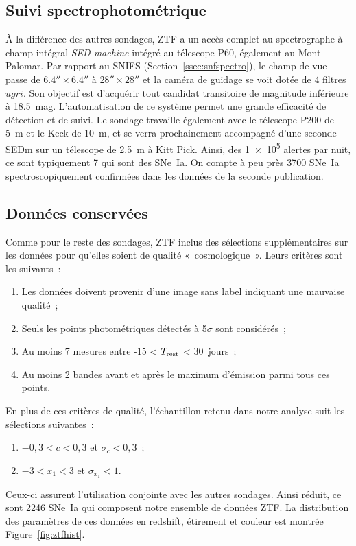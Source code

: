 \documentclass[../main/main.tex]{subfiles}
\begin{document}
\subsection{Suivi spectrophotométrique}\label{ssec:ztfspectro}

À la différence des autres sondages, ZTF a un accès complet au spectrographe à
champ intégral \textit{SED machine} \citep[SEDm, voir][]{blagorodnova2018,
rigault2019} intégré au télescope P60, également au Mont Palomar. Par rapport au
SNIFS (Section~\ref{ssec:snfspectro}), le champ de vue passe de
$\ang{;;6.4}\times\ang{;;6.4}$ à $\ang{;;28}\times\ang{;;28}$ et la caméra de
guidage se voit dotée de 4 filtres $ugri$. Son objectif est d'acquérir tout
candidat transitoire de magnitude inférieure à \SI{18.5}{mag}. L'automatisation
de ce système permet une grande efficacité de détection et de suivi. Le sondage
travaille également avec le télescope P200 de \SI{5}{m} et le Keck de
\SI{10}{m}, et se verra prochainement accompagné d'une seconde SEDm sur un
télescope de \SI{2.5}{m} à Kitt Pick. Ainsi, des \num{1e5} alertes par nuit, ce
sont typiquement 7 qui sont des SNe~Ia. On compte à peu près 3700 SNe~Ia
spectroscopiquement confirmées dans les données de la seconde publication.

\subsection{Données conservées}\label{ssec:ztfdata}

Comme pour le reste des sondages, ZTF inclus des sélections supplémentaires sur
les données pour qu'elles soient de qualité «~cosmologique~». Leurs critères
sont les suivants~:
\begin{enumerate}
    \item Les données doivent provenir d'une image sans label indiquant une
        mauvaise qualité~;
    \item Seuls les points photométriques détectés à 5$\sigma$ sont considérés~;
    \item Au moins 7 mesures entre -15 < $T_{\rm rest}$ < \SI{30}{jours}~;
    \item Au moins 2 bandes avant et après le maximum d'émission parmi tous ces
        points.
\end{enumerate}
En plus de ces critères de qualité, l'échantillon retenu dans notre analyse suit
les sélections suivantes~:
\begin{enumerate}[resume]
    \item $-0,3 < c < 0,3$ et $\sigma_{c} < 0,3$~;
    \item $-3 < x_1 < 3$ et $\sigma_{x_1} < 1$.
\end{enumerate}
Ceux-ci assurent l'utilisation conjointe avec les autres sondages. Ainsi réduit,
ce sont 2246 SNe~Ia qui composent notre ensemble de données ZTF. La distribution
des paramètres de ces données en redshift, étirement et couleur est montrée
Figure~\ref{fig:ztfhist}.
\end{document}
